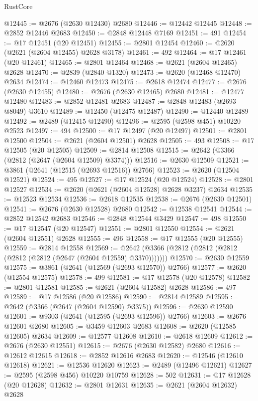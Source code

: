 \begin{lexlean}{RustCore}
\begin{coremodule}
@12445 := @2676 (@2630 @12430) @2680
@12446 := @12442 @12445
@12448 := @2852 @12446 @2683
@12450 := @2848 @12448 @7169
@12451 := 491
@12454 := @17 @12451 (@20 @12451)
@12455 := @2801 @12454
@12460 := @2620 (@2621 (@2604 @12455) @2628 @3178)
@12461 := 492
@12464 := @17 @12461 (@20 @12461)
@12465 := @2801 @12464
@12468 := @2621 (@2604 @12465) @2628
@12470 := @2839 (@2840 @1320)
@12473 := @2620 (@12468 @12470) @2634
@12474 := @12460 @12473
@12475 := @2618 @12474
@12477 := @2676 (@2630 @12455)
@12480 := @2676 (@2630 @12465) @2680
@12481 := @12477 @12480
@12483 := @2852 @12481 @2683
@12487 := @2848 @12483 (@2693 @8049) @3610
@12489 := @12450 (@12475 @12487)
@12490 := @12440 @12489
@12492 := @2489 (@12415 @12490)
@12496 := @2595 (@2598 @451) @10220 @2523
@12497 := 494
@12500 := @17 @12497 (@20 @12497)
@12501 := @2801 @12500
@12504 := @2621 (@2604 @12501) @2628
@12505 := 493
@12508 := @17 @12505 (@20 @12505)
@12509 := @2814 @12508
@12515 := @2642 (@3366 (@2812 (@2647 (@2604 @12509) @3374)))
@12516 := @2630 @12509
@12521 := @3861 (@2641 (@12515 (@2693 @12516)) @2766)
@12523 := @2620 (@12504 @12521)
@12524 := 495
@12527 := @17 @12524 (@20 @12524)
@12528 := @2801 @12527
@12534 := @2620 (@2621 (@2604 @12528) @2628 @3237) @2634
@12535 := @12523 @12534
@12536 := @2618 @12535
@12538 := @2676 (@2630 @12501)
@12541 := @2676 (@2630 @12528) @2680
@12542 := @12538 @12541
@12544 := @2852 @12542 @2683
@12546 := @2848 @12544 @3429
@12547 := 498
@12550 := @17 @12547 (@20 @12547)
@12551 := @2801 @12550
@12554 := @2621 (@2604 @12551) @2628
@12555 := 496
@12558 := @17 @12555 (@20 @12555)
@12559 := @2814 @12558
@12569 := @2642 (@3366 (@2812 (@2812 (@2812 (@2812 (@2812 (@2647 (@2604 @12559) @3370)))))))
@12570 := @2630 @12559
@12575 := @3861 (@2641 (@12569 (@2693 @12570)) @2766)
@12577 := @2620 (@12554 @12575)
@12578 := 499
@12581 := @17 @12578 (@20 @12578)
@12582 := @2801 @12581
@12585 := @2621 (@2604 @12582) @2628
@12586 := 497
@12589 := @17 @12586 (@20 @12586)
@12590 := @2814 @12589
@12595 := @2642 (@3366 (@2647 (@2604 @12590) @3375))
@12596 := @2630 @12590
@12601 := @9303 (@2641 (@12595 (@2693 @12596)) @2766)
@12603 := @2676 @12601 @2680
@12605 := @3459 @12603 @2683
@12608 := @2620 (@12585 @12605) @2634
@12609 := @12577 @12608
@12610 := @2618 @12609
@12612 := @2676 (@2630 @12551)
@12615 := @2676 (@2630 @12582) @2680
@12616 := @12612 @12615
@12618 := @2852 @12616 @2683
@12620 := @12546 (@12610 @12618)
@12621 := @12536 @12620
@12623 := @2489 (@12496 @12621)
@12627 := @2595 (@2598 @456) @10220 @10759
@12628 := 502
@12631 := @17 @12628 (@20 @12628)
@12632 := @2801 @12631
@12635 := @2621 (@2604 @12632) @2628

\end{coremodule}
\end{lexlean}
